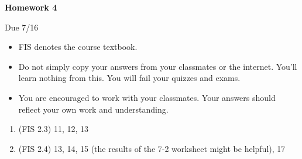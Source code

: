 \documentclass{article}
\begin{document}
\begin{center}
    {\bf Homework 4}
    
    Due 7/16
\end{center}

\begin{itemize}
    \item 
        FIS denotes the course textbook.
    \item
        Do not simply copy your answers from your classmates or the internet.
        You'll learn nothing from this. You will fail your quizzes and exams.
    \item
        You are encouraged to work with your classmates. Your answers
        should reflect your own work and understanding.
\end{itemize}

\begin{enumerate}
    \item
        (FIS 2.3) 11, 12, 13
    \item
        (FIS 2.4) 13, 14, 15 (the results of the 7-2 worksheet might be helpful), 17
\end{enumerate}
    
\end{document}
